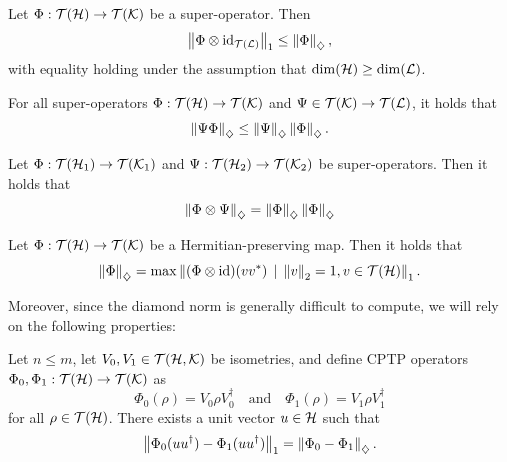 \begin{theorem} \cite[Theorem 3.46]{watrous2018theory} \label{thm_diamond_otimes_id}
  Let \(\Phi : \mathcal{T}(\mathcal{H}) \to \mathcal{T}(\mathcal{K})\) be a super-operator. Then
\[
\left\lVert \Phi \otimes \mathrm{id}_{\mathcal{T}(\mathcal{L})} \right\rVert_{1} \leq \left\lVert \Phi \right\rVert_{\diamondsuit},
\]
with equality holding under the assumption that $\dim(\mathcal{H}) \geq \dim(\mathcal{L})$.
\end{theorem}

\begin{proposition} \cite[Proposition 3.48]{watrous2018theory} \label{prop:diamond_submult}
  For all super-operators \(\Phi : \mathcal{T}(\mathcal{H}) \to \mathcal{T}(\mathcal{K})\) and \(\Psi \in \mathcal{T}(\mathcal{K}) \to \mathcal{T}(\mathcal{L})\), it holds that
  \begin{align*}
    \left\lVert \Psi \Phi \right\rVert_{\diamondsuit} \leq  \left\lVert \Psi \right\rVert_{\diamondsuit} \left\lVert \Phi \right\rVert_{\diamondsuit}. 
  \end{align*}
\end{proposition}

\begin{theorem} \cite[Theorem 3.49]{watrous2018theory}\label{thm:diamond_tensor_comp}
  Let $\Phi : \mathcal{T}(\mathcal{H}_1) \to \mathcal{T}(\mathcal{K}_1)$ and \(\Psi: \mathcal{T}(\mathcal{H}_2) \to \mathcal{T}(\mathcal{K}_2)\) be super-operators. Then it holds that
\[
\left\lVert \Phi \otimes \Psi \right\rVert_{\diamondsuit} = \left\lVert \Phi \right\rVert_{\diamondsuit}\left\lVert \Phi \right\rVert_{\diamondsuit}
\]
\end{theorem}



\begin{theorem} \cite[Theorem 3.51]{watrous2018theory} \label{thm_hem-pres_vv*}
  Let $\Phi:  \mathcal{T}(\mathcal{H}) \to \mathcal{T}(\mathcal{K})$ be a Hermitian-preserving map. Then it holds that
\[
\left\lVert \Phi \right\rVert_{\diamondsuit} = \max \left\lVert (\Phi \otimes \mathrm{id})(vv^*) \, \mid \, \left\lVert v \right\rVert_{2} =1 , v\in \mathcal{T}(\mathcal{H})  \right\rVert_{1}.
\]
\end{theorem}

Moreover, since the diamond norm is generally difficult to compute, we will rely on the following properties:

\begin{theorem} \cite[Theorem 3.55]{watrous2018theory} \label{theorem:diamond_iso}
  Let  $ n \leq m$, let $V_0,V_1 \in \mathcal{T}(\mathcal{H},\mathcal{K})$ be isometries, and define CPTP operators $\Phi_0,\Phi_1:\mathcal{T}(\mathcal{H}) \to \mathcal{T}(\mathcal{K})$ as
\[
\Phi_0(\rho) = V_0 \rho V_0^\dag \quad \text{and} \quad \Phi_1(\rho) = V_1 \rho V_1^\dag
\]
for all $\rho \in \mathcal{T}(\mathcal{H})$. There exists a unit vector $u \in \mathcal{H} $ such that
\[
\left\lVert \Phi_0(uu^\dag) - \Phi_1(uu^\dag) \right\rVert_{1} = \left\lVert \Phi_0 - \Phi_1 \right\rVert_{\diamondsuit}.
\]
\end{theorem}

